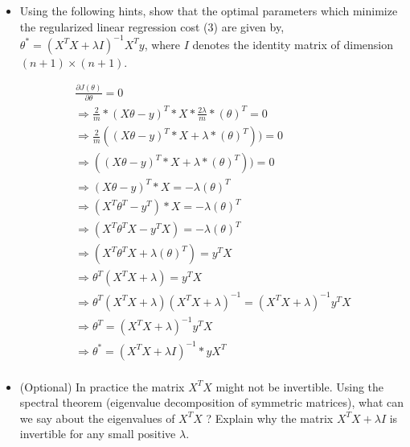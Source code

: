 \documentclass[a4paper]{article}
\begin{document}
\begin{itemize}

\item{Using the following hints, show that the optimal parameters which minimize the regularized linear regression cost (3) are given by, $\theta^{*}=(X^{T}X+\lambda I)^{-1}X^{T}y$, where $I$ denotes the identity matrix of dimension $(n+1) \times (n+1)$.}

\begin{align}
\frac{\partial J(\theta)}{\partial \theta} = 0 \\
\Rightarrow \frac{2}{m} * (X\theta - y)^T * X * \frac{2\lambda}{m} * (\theta)^T = 0 \\
\Rightarrow \frac{2}{m} ((X\theta - y)^T * X + \lambda * (\theta)^T)) = 0 \\
\Rightarrow ((X\theta - y)^T * X + \lambda * (\theta)^T)) = 0 \\
\Rightarrow (X\theta - y)^T * X = -\lambda(\theta)^T \\
\Rightarrow (X^T\theta^T - y^T) * X = -\lambda(\theta)^T \\
\Rightarrow (X^T\theta^TX - y^TX) = -\lambda(\theta)^T \\
\Rightarrow (X^T\theta^TX + \lambda(\theta)^T) = y^TX \\
\Rightarrow \theta^T(X^TX + \lambda) = y^TX \\
\Rightarrow \theta^T(X^TX + \lambda)(X^TX + \lambda)^{-1} = (X^TX + \lambda)^{-1} y^TX \\
\Rightarrow \theta^T = (X^TX + \lambda)^{-1} y^TX \\
\Rightarrow \theta^* = (X^TX + \lambda I)^{-1} * yX^T \\
\end{align}

\item{(Optional) In practice the matrix $X^{T} X$ might not be invertible. Using the spectral theorem (eigenvalue
decomposition of symmetric matrices), what can we say about the eigenvalues of $X^{T} X$ ? Explain why
the matrix $X^{T} X + \lambda I$ is invertible for any small positive $\lambda$.}
\end{itemize}
\end{document}
